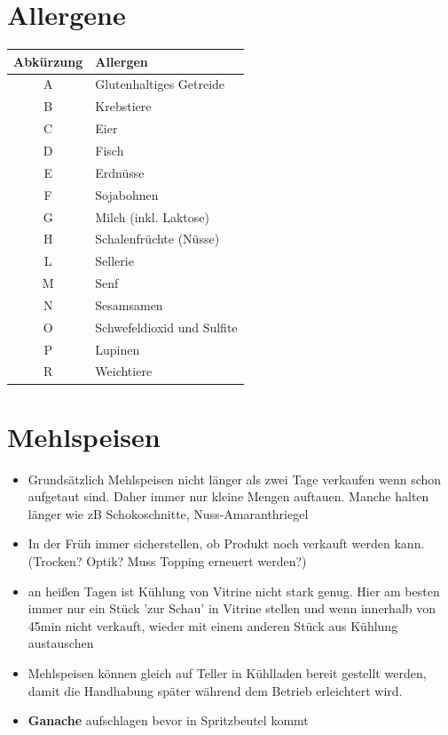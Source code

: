 \documentclass[a4paper,12pt]{article}
\newcounter{row}
\begin{document}
\clearpage

\section{Allergene}

\begin{tabularx}{\textwidth}{|c|X|}
\hline
\rowcolor{gray!25}
\textbf{Abkürzung} & \textbf{Allergen} \\ \hline
A & Glutenhaltiges Getreide \\ \hline
B & Krebstiere \\ \hline
C & Eier \\ \hline
D & Fisch \\ \hline
E & Erdnüsse \\ \hline
F & Sojabohnen \\ \hline
G & Milch (inkl. Laktose) \\ \hline
H & Schalenfrüchte (Nüsse) \\ \hline
L & Sellerie \\ \hline
M & Senf \\ \hline
N & Sesamsamen \\ \hline
O & Schwefeldioxid und Sulfite \\ \hline
P & Lupinen \\ \hline
R & Weichtiere \\ \hline
\end{tabularx}


\clearpage
\section{Mehlspeisen}\label{sec:mehlspeisen}

\begin{itemize}[topsep=0pt, itemsep=0pt, leftmargin=*]
    \item[] Grundsätzlich Mehlspeisen nicht länger als zwei Tage verkaufen wenn schon aufgetaut sind. Daher immer nur kleine Mengen auftauen. Manche halten länger wie zB Schokoschnitte, Nuss-Amaranthriegel
    \item[] In der Früh immer sicherstellen, ob Produkt noch verkauft werden kann. (Trocken? Optik? Muss Topping erneuert werden?)
    \item[] an heißen Tagen ist Kühlung von Vitrine nicht stark genug. Hier am besten immer nur ein Stück 'zur Schau' in Vitrine stellen und wenn innerhalb von 45min nicht verkauft, wieder mit einem anderen Stück aus Kühlung austauschen
    \item[] Mehlspeisen können gleich auf Teller in Kühlladen bereit gestellt werden, damit die Handhabung später während dem Betrieb erleichtert wird.
    \item[] \textbf{Ganache} aufschlagen bevor in Spritzbeutel kommt 
\end{itemize}
\end{document}
